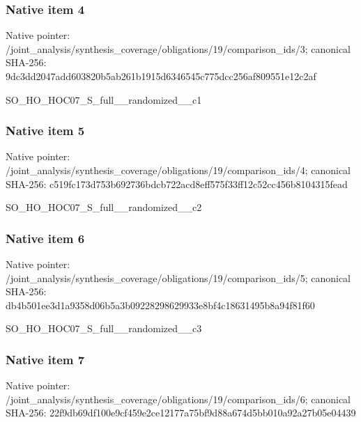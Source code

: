 \documentclass[10pt,a4paper]{article}
\begin{document}
\subsubsection{Native item 4}
Native pointer: /joint\_\allowbreak{}analysis/synthesis\_\allowbreak{}coverage/obligations/19/comparison\_\allowbreak{}ids/3; canonical SHA-256: 9dc3dd2047add603820b5ab261b1915d6346545c775dcc256af809551e12c2af

\begingroup\raggedright\sloppy SO\_\allowbreak{}HO\_\allowbreak{}HOC07\_\allowbreak{}S\_\allowbreak{}full\_\allowbreak{}\_\allowbreak{}randomized\_\allowbreak{}\_\allowbreak{}c1\par\endgroup

\subsubsection{Native item 5}
Native pointer: /joint\_\allowbreak{}analysis/synthesis\_\allowbreak{}coverage/obligations/19/comparison\_\allowbreak{}ids/4; canonical SHA-256: c519fc173d753b692736bdcb722acd8eff575f33ff12c52cc456b8104315fead

\begingroup\raggedright\sloppy SO\_\allowbreak{}HO\_\allowbreak{}HOC07\_\allowbreak{}S\_\allowbreak{}full\_\allowbreak{}\_\allowbreak{}randomized\_\allowbreak{}\_\allowbreak{}c2\par\endgroup

\subsubsection{Native item 6}
Native pointer: /joint\_\allowbreak{}analysis/synthesis\_\allowbreak{}coverage/obligations/19/comparison\_\allowbreak{}ids/5; canonical SHA-256: db4b501ee3d1a9358d06b5a3b09228298629933e8bf4c18631495b8a94f81f60

\begingroup\raggedright\sloppy SO\_\allowbreak{}HO\_\allowbreak{}HOC07\_\allowbreak{}S\_\allowbreak{}full\_\allowbreak{}\_\allowbreak{}randomized\_\allowbreak{}\_\allowbreak{}c3\par\endgroup

\subsubsection{Native item 7}
Native pointer: /joint\_\allowbreak{}analysis/synthesis\_\allowbreak{}coverage/obligations/19/comparison\_\allowbreak{}ids/6; canonical SHA-256: 22f9db69df100e9cf459e2ce12177a75bf9d88a674d5bb010a92a27b05e04439
\end{document}
